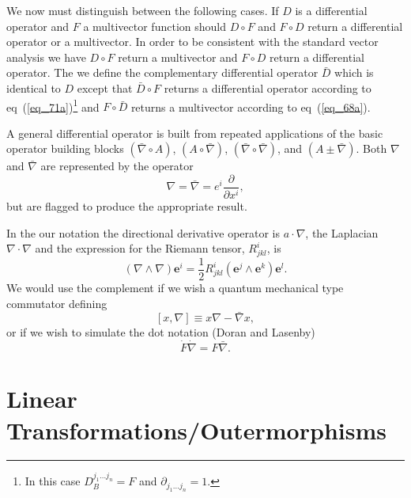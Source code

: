 \documentclass[12pt]{report}
\newcommand{\bm}[1]{\boldsymbol{#1}}
\newcommand{\bfrac}[2]{\displaystyle\frac{#1}{#2}}
\newcommand{\lp}{\left (}
\newcommand{\rp}{\right )}
\newcommand{\half}{\frac{1}{2}}
\newcommand{\pdiff}[2]{\bfrac{\partial {#1}}{\partial {#2}}}
\newcommand{\W}{\wedge}
\newcommand{\lbrk}{\left [}
\newcommand{\rbrk}{\right ]}
\newcommand{\com}[1]{\lbrk {#1} \rbrk}
\newcommand{\paren}[1]{\lp {#1} \rp}
\newcommand{\be}{\begin{equation}}
\newcommand{\ee}{\end{equation}}
\newcommand{\eb}{\bm{e}}
\begin{document}
We now must distinguish between the following cases.  If $D$ is a differential operator and $F$ a multivector function should $D\circ F$ and
$F\circ D$ return a differential operator or a multivector. In order to be consistent with the standard vector analysis we have $D\circ F$ 
return a multivector and $F\circ D$ return a differential operator.  The we define the complementary differential operator $\bar{D}$ which
is identical to $D$ except that $\bar{D}\circ F$ returns a differential operator according to eq~(\ref{eq_71a})\footnote{In this case
$D_{B}^{j_{1}\dots j_{n}} = F$ and $\partial_{j_{1}\dots j_{n}} = 1$.} and $F\circ\bar{D}$ returns a multivector according to eq~(\ref{eq_68a}). 

A general differential operator is built from repeated applications of the basic operator building blocks $\paren{\bar{\nabla}\circ A}$,
$\paren{A\circ\bar{\nabla}}$, $\paren{\bar{\nabla}\circ\bar{\nabla}}$, and $\paren{A\pm \bar{\nabla}}$.  Both $\nabla$ and  $\bar{\nabla}$
are represented by the operator
\be
	\nabla = \bar{\nabla} = e^{i}\pdiff{}{x^{i}},
\ee
but are flagged to produce the appropriate result.

In the our notation the directional derivative operator is $a\cdot\nabla$, the Laplacian 
$\nabla\cdot\nabla$ and the expression for the Riemann tensor, $R^{i}_{jkl}$, is
\be
	\paren{\nabla\W\nabla}\eb^{i} = \half R^{i}_{jkl}\paren{\eb^{j}\W\eb^{k}}\eb^{l}.
\ee
We would use the complement if we wish a quantum mechanical type commutator defining
\be
	\com{x,\nabla} \equiv x\nabla - \bar{\nabla}x,
\ee
or if we wish to simulate the dot notation (Doran and Lasenby)
\be
	\dot{F}\dot{\nabla} = F\bar{\nabla}.
\ee



\section{Linear Transformations/Outermorphisms}\label{Ltrans}
\end{document}
